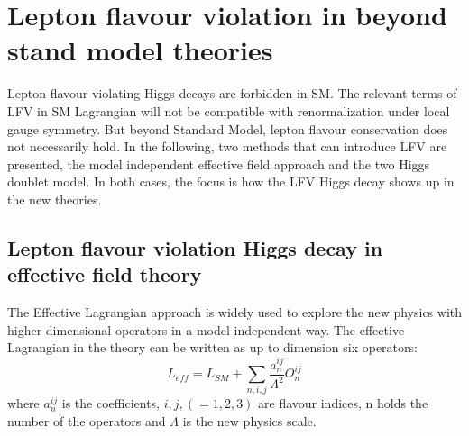 







\section{Lepton flavour violation in beyond stand model theories}
Lepton flavour violating Higgs decays are forbidden in SM. The relevant terms of LFV in SM Lagrangian will not be compatible with renormalization under local gauge symmetry. But beyond Standard Model, lepton flavour conservation does not necessarily hold. In the following, two methods that can introduce LFV are presented, the model independent effective field approach and the two Higgs doublet model. In both cases, the focus is how the LFV Higgs decay shows up in the new theories. 


\subsection{Lepton flavour violation Higgs decay in effective field theory}\label{effective_field}
The Effective Lagrangian approach is widely used to explore the new physics with higher dimensional operators in a model independent way. The effective Lagrangian in the theory can be written as up to dimension six operators: 
\begin{equation}
L_{eff}=L_{SM}+\sum_{n,i,j}\frac{a^{ij}_{n}}{\Lambda^{2}}O^{ij}_{n}
\end{equation}
where $a^{ij}_{n}$ is the coefficients, $i,j,(=1,2,3)$ are flavour indices, n holds the number of the operators and $\Lambda$ is the new physics scale. 

